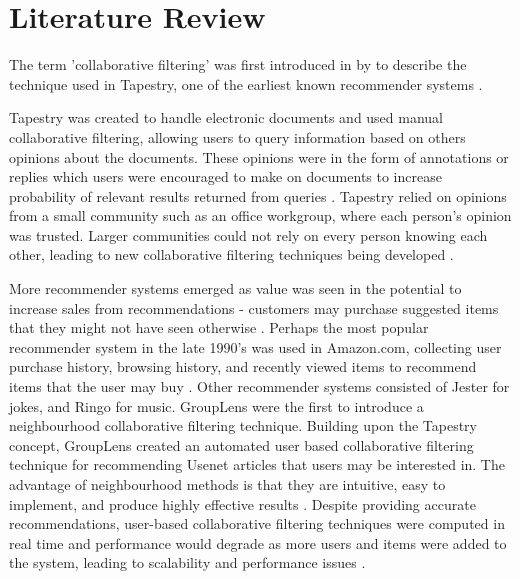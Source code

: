 \section{Literature Review}

The term 'collaborative filtering' was first introduced in \citeyear{goldberg1992using} by \citeauthor{goldberg1992using} to describe the technique used in Tapestry, one of the earliest known recommender systems \cite{koren2009matrix,  goldberg1992using, itembased, survey}.

Tapestry \cite{goldberg1992using} was created to handle electronic documents and used manual collaborative filtering, allowing users to query information based on others opinions about the documents. These opinions were in the form of annotations or replies which users were encouraged to make on documents to increase probability of relevant results returned from queries \cite{schafer2007collaborative}. Tapestry relied on opinions from a small community such as an office workgroup, where each person's opinion was trusted. Larger communities could not rely on every person knowing each other, leading to new collaborative filtering techniques being developed \cite{itembased}. 

More recommender systems emerged as value was seen in the potential to increase sales from recommendations - customers may purchase suggested items that they might not have seen otherwise \cite{schafer2007collaborative}. Perhaps the most popular recommender system in the late 1990's was used in Amazon.com, collecting user purchase history, browsing history, and recently viewed items to recommend items that the user may buy \cite{schafer2007collaborative}. Other recommender systems consisted of Jester \cite{goldberg} for jokes, and Ringo \cite{ringo} for music.
GroupLens \cite{grouplens} were the first to introduce a neighbourhood collaborative filtering technique. Building upon the Tapestry concept, GroupLens created an automated user based collaborative filtering technique for recommending Usenet articles that users may be interested in. The advantage of neighbourhood methods is that they are intuitive, easy to implement, and produce highly effective results \cite{survey, scalable}. Despite providing accurate recommendations, user-based collaborative filtering techniques were computed in real time and performance would degrade as more users and items were added to the system, leading to scalability and performance issues \cite{dimension, itembased, evaluationitem}.

